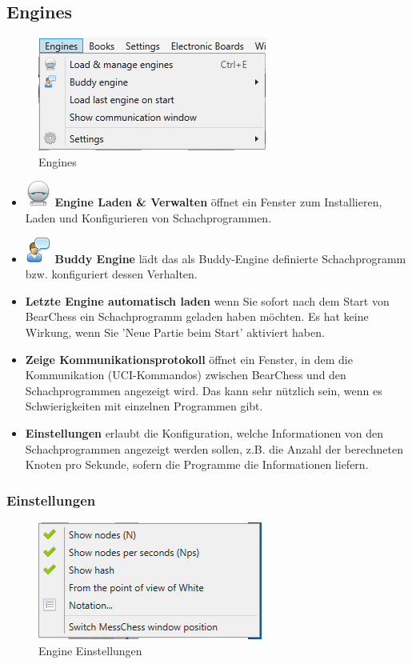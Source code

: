 \documentclass[11pt,a4paper]{article}
\begin{document}
	\subsection{Engines}
	\begin{figure}[H]
		\centering
		\includegraphics[scale=1.0]{Engines.png}
		\caption{Engines}
		\label{fig:Engines}
	\end{figure}
	\begin{itemize}
		\item  \includegraphics[scale=0.5]{robot.png} \textbf{Engine Laden \& Verwalten} öffnet ein Fenster zum Installieren, Laden und Konfigurieren von Schachprogrammen.
		\item  \includegraphics[scale=0.5]{user_comment.png} \textbf{Buddy Engine} lädt das als Buddy-Engine definierte Schachprogramm bzw. konfiguriert dessen Verhalten.
		\item \textbf{Letzte Engine automatisch laden} wenn Sie sofort nach dem Start von BearChess ein Schachprogramm geladen haben möchten. Es hat keine Wirkung, wenn Sie 'Neue Partie beim Start' aktiviert haben.
		\item \textbf{Zeige Kommunikationsprotokoll} öffnet ein Fenster, in dem die Kommunikation (UCI-Kommandos) zwischen BearChess und den Schachprogrammen angezeigt wird. Das kann sehr nützlich sein, wenn es Schwierigkeiten mit einzelnen Programmen gibt.
		\item \textbf{Einstellungen} erlaubt die Konfiguration, welche Informationen von den Schachprogrammen angezeigt werden sollen, z.B. die Anzahl der berechneten Knoten pro Sekunde, sofern die Programme  die Informationen liefern.
	\end{itemize}
	
	\subsubsection{Einstellungen}
	\begin{figure}[H]
		\centering
		\includegraphics[scale=1.0]{engineSettings.png}
		\caption{Engine Einstellungen}
		\label{fig:EngineSettings}
	\end{figure}
	
\end{document}
